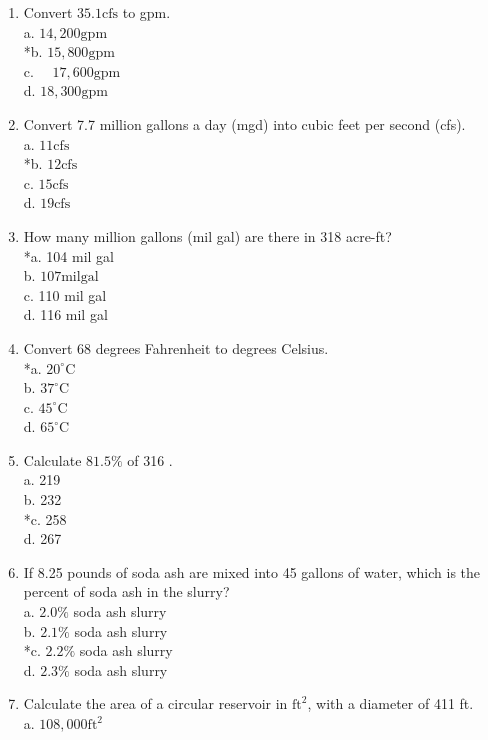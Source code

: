 \begin{enumerate}
  \item Convert $35.1 \mathrm{cfs}$ to gpm.\\
a. $14,200 \mathrm{gpm}$\\
*b. $15,800 \mathrm{gpm}$\\
c. $\quad 17,600 \mathrm{gpm}$\\
d. $18,300 \mathrm{gpm}$ 
  \item Convert 7.7 million gallons a day (mgd) into cubic feet per second (cfs).\\
a. $11 \mathrm{cfs}$\\
*b. $12 \mathrm{cfs}$\\
c. $15 \mathrm{cfs}$\\
d. $19 \mathrm{cfs}$\\
  \item How many million gallons (mil gal) are there in 318 acre-ft?\\
*a. 104 mil gal\\
b. $107 \mathrm{mil} \mathrm{gal}$\\
c. 110 mil gal\\
d. 116 mil gal\\
  \item Convert 68 degrees Fahrenheit to degrees Celsius.\\
*a. $20^{\circ} \mathrm{C}$\\
b. $37^{\circ} \mathrm{C}$\\
c. $45^{\circ} \mathrm{C}$\\
d. $65^{\circ} \mathrm{C}$\\
  \item Calculate $81.5 \%$ of 316 .\\
a. 219\\
b. 232\\
*c. 258\\
d. 267\\
  \item If 8.25 pounds of soda ash are mixed into 45 gallons of water, which is the percent of soda ash in the slurry?\\
a. $2.0 \%$ soda ash slurry\\
b. $2.1 \%$ soda ash slurry\\
*c. $2.2 \%$ soda ash slurry\\
d. $2.3 \%$ soda ash slurry\\
  \item Calculate the area of a circular reservoir in $\mathrm{ft}^{2}$, with a diameter of 411 ft.\\
a. $108,000 \mathrm{ft}^{2}$\\

\end{enumerate}
